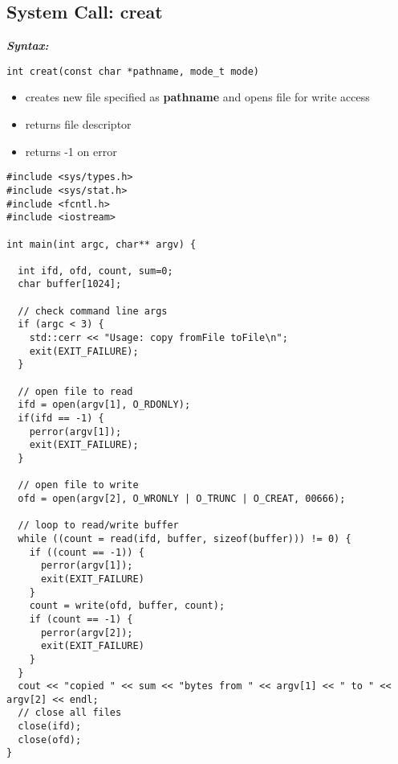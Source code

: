 \documentclass{report}
\begin{document}
\subsection{System Call: creat}
\bigbreak \noindent
\textbf{\textit{Syntax:}}
\begin{verbatim}
int creat(const char *pathname, mode_t mode)
\end{verbatim}
\begin{itemize}
  \item creates new file specified as \textbf{pathname} and opens file for write access
  \item returns file descriptor
  \item returns -1 on error
\end{itemize}
\begin{verbatim}
#include <sys/types.h>
#include <sys/stat.h>
#include <fcntl.h>
#include <iostream>

int main(int argc, char** argv) {

  int ifd, ofd, count, sum=0;
  char buffer[1024];

  // check command line args
  if (argc < 3) {
    std::cerr << "Usage: copy fromFile toFile\n";
    exit(EXIT_FAILURE);
  }

  // open file to read
  ifd = open(argv[1], O_RDONLY);
  if(ifd == -1) {
    perror(argv[1]);
    exit(EXIT_FAILURE);
  }

  // open file to write
  ofd = open(argv[2], O_WRONLY | O_TRUNC | O_CREAT, 00666);
  
  // loop to read/write buffer
  while ((count = read(ifd, buffer, sizeof(buffer))) != 0) {
    if ((count == -1)) {
      perror(argv[1]);
      exit(EXIT_FAILURE)
    }
    count = write(ofd, buffer, count);
    if (count == -1) {
      perror(argv[2]);
      exit(EXIT_FAILURE)
    }
  }
  cout << "copied " << sum << "bytes from " << argv[1] << " to " << argv[2] << endl;
  // close all files
  close(ifd);
  close(ofd);
}
\end{verbatim}
\end{document}
